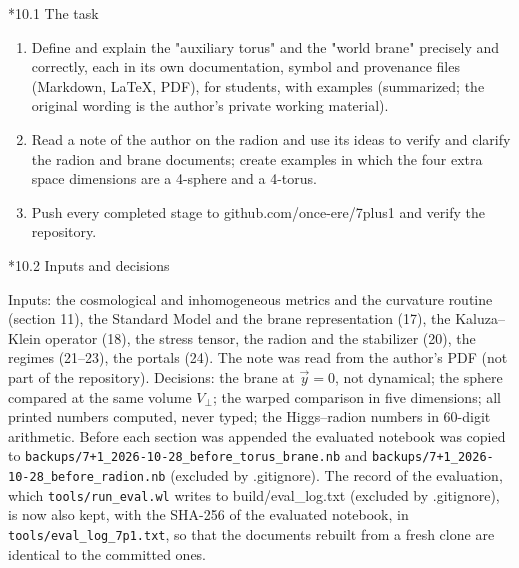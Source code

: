 \documentclass[10pt,a4paper]{article}
\makeatletter
\renewcommand\subsection{\@startsection{subsection}{2}{\z@}{-3.25ex\@plus -1ex \@minus -.2ex}{1.5ex \@plus .2ex}{\normalfont\large\bfseries\raggedright}}
\makeatother
\begin{document}
\subsection*{10.1 The task}
\begin{enumerate}
\item Define and explain the "auxiliary torus" and the "world brane" precisely and correctly, each in its own documentation, symbol and provenance files (Markdown, LaTeX, PDF), for students, with examples (summarized; the original wording is the author’s private working material).
\item Read a note of the author on the radion and use its ideas to verify and clarify the radion and brane documents; create examples in which the four extra space dimensions are a 4-sphere and a 4-torus.
\item Push every completed stage to github.com/once-ere/7plus1 and verify the repository.
\end{enumerate}
\subsection*{10.2 Inputs and decisions}
Inputs: the cosmological and inhomogeneous metrics and the curvature routine (section 11), the Standard Model and the brane representation (17), the Kaluza–Klein operator (18), the stress tensor, the radion and the stabilizer (20), the regimes (21–23), the portals (24). The note was read from the author’s PDF (not part of the repository). Decisions: the brane at $\vec y=0$, not dynamical; the sphere compared at the same volume $V_\perp$; the warped comparison in five dimensions; all printed numbers computed, never typed; the Higgs–radion numbers in 60-digit arithmetic. Before each section was appended the evaluated notebook was copied to \texttt{backups/\allowbreak{}7+1\_\allowbreak{}2026-10-28\_\allowbreak{}before\_\allowbreak{}torus\_\allowbreak{}brane.nb} and \texttt{backups/\allowbreak{}7+1\_\allowbreak{}2026-10-28\_\allowbreak{}before\_\allowbreak{}radion.nb} (excluded by .gitignore). The record of the evaluation, which \texttt{tools/\allowbreak{}run\_\allowbreak{}eval.wl} writes to build/eval\_log.txt (excluded by .gitignore), is now also kept, with the SHA-256 of the evaluated notebook, in \texttt{tools/\allowbreak{}eval\_\allowbreak{}log\_\allowbreak{}7p1.txt}, so that the documents rebuilt from a fresh clone are identical to the committed ones.
\end{document}
